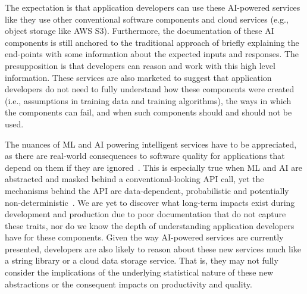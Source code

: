 The expectation is that application developers can use these AI-powered services like they use other conventional software components and cloud services (e.g., object storage like AWS S3). Furthermore, the documentation of these AI components is still anchored to the traditional approach of briefly explaining the end-points with some information about the expected inputs and responses. The presupposition is that developers can reason and work with this high level information. These services are also marketed to suggest that application developers do not need to fully understand how these components were created (i.e., assumptions in training data and training algorithms), the ways in which the components can fail, and when such components should and should not be used.

The nuances of ML and AI powering intelligent services have to be appreciated, as there are real-world consequences to software quality for applications that depend on them if they are ignored~\citep{Cummaudo:2019va}. This is especially true when ML and AI are abstracted and masked behind a conventional-looking API call, yet the mechanisms behind the API are data-dependent, probabilistic and potentially non-deterministic~\citep{Ohtake:2019vi}. We are yet to discover what long-term impacts exist during development and production due to poor documentation that do not capture these traits, nor do we know the depth of understanding application developers have for these components. Given the way AI-powered services are currently presented, developers are also likely to reason about these new services much like a string library or a cloud data storage service. That is, they may not fully consider the implications of the underlying statistical nature of these new abstractions or the consequent impacts on productivity and quality.

